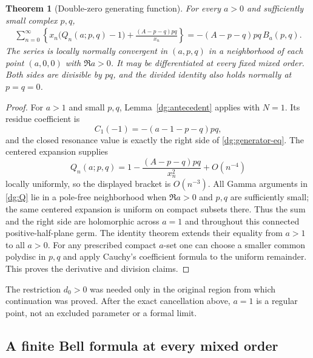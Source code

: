 \documentclass[11pt,a4paper]{article}
\numberwithin{equation}{section}
\newtheorem{theorem}{Theorem}[section]
\theoremstyle{definition}
\theoremstyle{remark}
\begin{document}
\begin{theorem}[Double-zero generating function]
\label{dg:generator}
For every $a>0$ and sufficiently small complex $p,q$,
\begin{align}
 \sum_{n=0}^{\infty}\left\{
 x_n\bigl(Q_n(a;p,q)-1\bigr)
       +\frac{(A-p-q)pq}{x_n}\right\}
 =-(A-p-q)pq\,B_a(p,q).
 \label{dg:generator-eq}
\end{align}
The series is locally normally convergent in $(a,p,q)$ in a
neighborhood of each point $(a,0,0)$ with $\Re a>0$. It may be
differentiated at every fixed mixed order. Both sides are divisible
by $pq$, and the divided identity also holds normally at $p=q=0$.
\end{theorem}
\begin{proof}
For $a>1$ and small $p,q$, Lemma~\ref{dg:antecedent} applies with
$N=1$. Its residue coefficient is
\[
 C_1(-1)=-(a-1-p-q)pq,
\]
and the closed resonance value is exactly the right side of
\eqref{dg:generator-eq}. The centered expansion supplies
\[
 Q_n(a;p,q)=1-\frac{(A-p-q)pq}{x_n^2}+O(n^{-4})
\]
locally uniformly, so the displayed bracket is $O(n^{-3})$.
All Gamma arguments in \eqref{dg:Q} lie in a pole-free
neighborhood when $\Re a>0$ and $p,q$ are sufficiently small; the
same centered expansion is uniform on compact subsets there.
Thus the sum and the right side are holomorphic across $a=1$ and
throughout this connected positive-half-plane germ. The identity
theorem extends their equality from $a>1$ to all $a>0$.
For any prescribed compact $a$-set one can choose a smaller common
polydisc in $p,q$ and apply Cauchy's coefficient formula to the
uniform remainder. This proves the derivative and division claims.
\end{proof}

The restriction $d_0>0$ was needed only in the original region from
which continuation was proved. After the exact cancellation above,
$a=1$ is a regular point, not an excluded parameter or a formal limit.

\subsection{A finite Bell formula at every mixed order}
\end{document}
